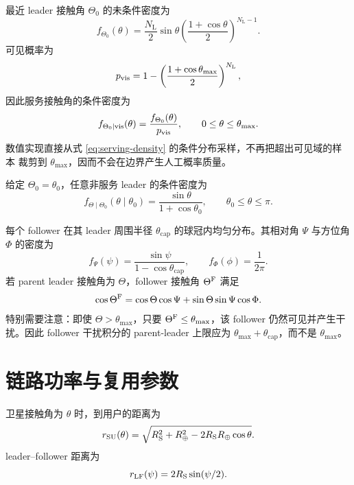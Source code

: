 \documentclass[UTF8,a4paper,11pt]{ctexart}
\newcommand{\NL}{N_{\mathrm L}}
\newcommand{\Rearth}{R_{\oplus}}
\newcommand{\Rsat}{R_{\mathrm S}}
\newcommand{\thetam}{\theta_{\max}}
\newcommand{\thetac}{\theta_{\mathrm{cap}}}
\begin{document}
最近 leader 接触角 $\Theta_0$ 的未条件密度为
\begin{equation}
 f_{\Theta_0}(\theta)
 =
 \frac{\NL}{2}\sin\theta
 \left(\frac{1+\cos\theta}{2}\right)^{\NL-1}.
\end{equation}
可见概率为
\begin{equation}
 p_{\rm vis}
 =
 1-\left(\frac{1+\cos\thetam}{2}\right)^{\NL},
\end{equation}
因此服务接触角的条件密度为
\begin{equation}
 f_{\Theta_0\mid{\rm vis}}(\theta)
 =
 \frac{f_{\Theta_0}(\theta)}{p_{\rm vis}},
 \qquad 0\leq\theta\leq\thetam.
 \label{eq:serving-density}
\end{equation}
数值实现直接从式 \eqref{eq:serving-density} 的条件分布采样，不再把超出可见域的样本
裁剪到 $\thetam$，因而不会在边界产生人工概率质量。

给定 $\Theta_0=\theta_0$，任意非服务 leader 的条件密度为
\begin{equation}
 f_{\Theta\mid\Theta_0}(\theta\mid\theta_0)
 =
 \frac{\sin\theta}{1+\cos\theta_0},
 \qquad \theta_0\leq\theta\leq\pi.
 \label{eq:other-leader-density}
\end{equation}

每个 follower 在其 leader 周围半径 $\thetac$ 的球冠内均匀分布。其相对角
$\Psi$ 与方位角 $\Phi$ 的密度为
\begin{equation}
 f_\Psi(\psi)=\frac{\sin\psi}{1-\cos\thetac},
 \qquad
 f_\Phi(\phi)=\frac{1}{2\pi}.
\end{equation}
若 parent leader 接触角为 $\Theta$，follower 接触角 $\Theta^{\rm F}$ 满足
\begin{equation}
 \cos\Theta^{\rm F}
 =
 \cos\Theta\cos\Psi+\sin\Theta\sin\Psi\cos\Phi.
 \label{eq:follower-contact}
\end{equation}
特别需要注意：即使 $\Theta>\thetam$，只要 $\Theta^{\rm F}\leq\thetam$，该 follower
仍然可见并产生干扰。因此 follower 干扰积分的 parent-leader 上限应为
$\thetam+\thetac$，而不是 $\thetam$。

\section{链路功率与复用参数}

卫星接触角为 $\theta$ 时，到用户的距离为
\begin{equation}
 r_{\rm SU}(\theta)
 =
 \sqrt{\Rsat^2+\Rearth^2-2\Rsat\Rearth\cos\theta}.
\end{equation}
leader--follower 距离为
\begin{equation}
 r_{\rm LF}(\psi)=2\Rsat\sin(\psi/2).
\end{equation}
\end{document}
